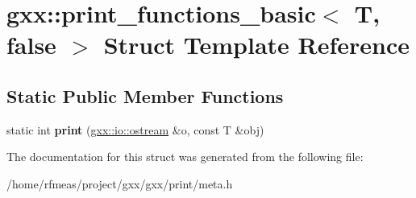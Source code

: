 \hypertarget{structgxx_1_1print__functions__basic_3_01T_00_01false_01_4}{}\section{gxx\+:\+:print\+\_\+functions\+\_\+basic$<$ T, false $>$ Struct Template Reference}
\label{structgxx_1_1print__functions__basic_3_01T_00_01false_01_4}
\subsection*{Static Public Member Functions}
\begin{DoxyCompactItemize}
\item 
static int {\bfseries print} (\hyperlink{classgxx_1_1io_1_1ostream}{gxx\+::io\+::ostream} \&o, const T \&obj)\hypertarget{structgxx_1_1print__functions__basic_3_01T_00_01false_01_4_a15504bd2e1af7a64c029a53ddd3536ed}{}\label{structgxx_1_1print__functions__basic_3_01T_00_01false_01_4_a15504bd2e1af7a64c029a53ddd3536ed}

\end{DoxyCompactItemize}


The documentation for this struct was generated from the following file\+:\begin{DoxyCompactItemize}
\item 
/home/rfmeas/project/gxx/gxx/print/meta.\+h\end{DoxyCompactItemize}
